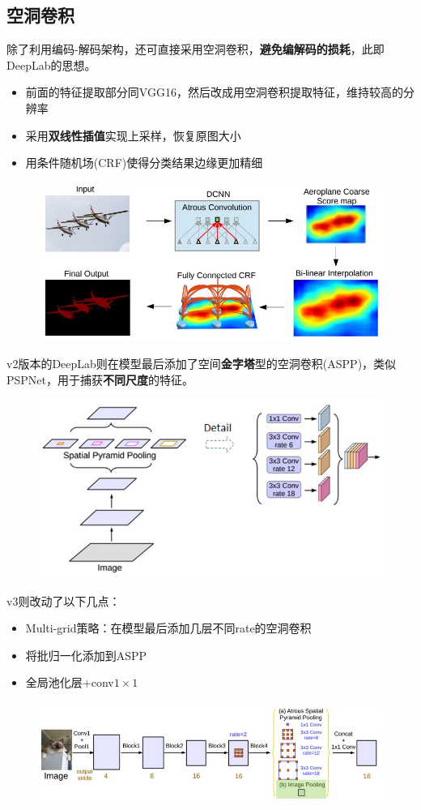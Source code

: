 \subsection{空洞卷积}
除了利用编码-解码架构，还可直接采用空洞卷积，\textbf{避免编解码的损耗}，此即DeepLab\cite{chen:deeplab_2016}的思想。
\begin{itemize}
	\item 前面的特征提取部分同VGG16，然后改成用空洞卷积提取特征，维持较高的分辨率
	\item 采用\textbf{双线性插值}实现上采样，恢复原图大小
	\item 用条件随机场(CRF)使得分类结果边缘更加精细
\end{itemize}
\begin{figure}[H]
\centering
\includegraphics[width=0.7\linewidth]{fig/deeplabv1.jpg}
\end{figure}

v2版本的DeepLab则在模型最后添加了空间\textbf{金字塔}型的空洞卷积(ASPP)，类似PSPNet，用于捕获\textbf{不同尺度}的特征。
\begin{figure}[H]
\centering
\includegraphics[width=0.6\linewidth]{fig/deeplabv2.jpg}
\end{figure}

v3则改动了以下几点：
\begin{itemize}
	\item Multi-grid策略：在模型最后添加几层不同rate的空洞卷积
	\item 将批归一化添加到ASPP
	\item 全局池化层+conv$1\times 1$
\end{itemize}
\begin{figure}[H]
\centering
\includegraphics[width=0.8\linewidth]{fig/deeplabv3.jpg}
\end{figure}

